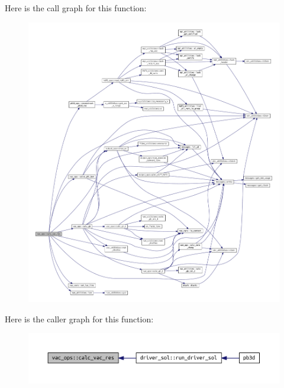 Here is the call graph for this function\+:\nopagebreak
\begin{figure}[H]
\begin{center}
\leavevmode
\includegraphics[width=350pt]{namespacevac__ops_a5e5a8322b3aa2e3704b1050426f06d9d_cgraph}
\end{center}
\end{figure}
Here is the caller graph for this function\+:\nopagebreak
\begin{figure}[H]
\begin{center}
\leavevmode
\includegraphics[width=350pt]{namespacevac__ops_a5e5a8322b3aa2e3704b1050426f06d9d_icgraph}
\end{center}
\end{figure}
\mbox{\label{namespacevac__ops_a78969bf43f80f0df3acf23c47edf7aff}} 
